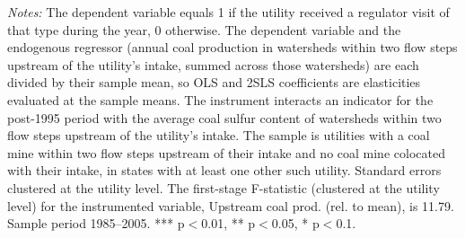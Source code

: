 \begin{table}[htbp]
\begin{minipage}{\linewidth}
\footnotesize
\raggedright
\textit{Notes:} The dependent variable equals 1 if the utility received a regulator visit of that type during the year, 0 otherwise. The dependent variable and the endogenous regressor (annual coal production in watersheds within two flow steps upstream of the utility's intake, summed across those watersheds) are each divided by their sample mean, so OLS and 2SLS coefficients are elasticities evaluated at the sample means. The instrument interacts an indicator for the post-1995 period with the average coal sulfur content of watersheds within two flow steps upstream of the utility's intake. The sample is utilities with a coal mine within two flow steps upstream of their intake and no coal mine colocated with their intake, in states with at least one other such utility. Standard errors clustered at the utility level. The first-stage F-statistic (clustered at the utility level) for the instrumented variable, Upstream coal prod. (rel. to mean), is 11.79. Sample period 1985--2005. *** p$<$0.01, ** p$<$0.05, * p$<$0.1.
\end{minipage}
\end{table}

